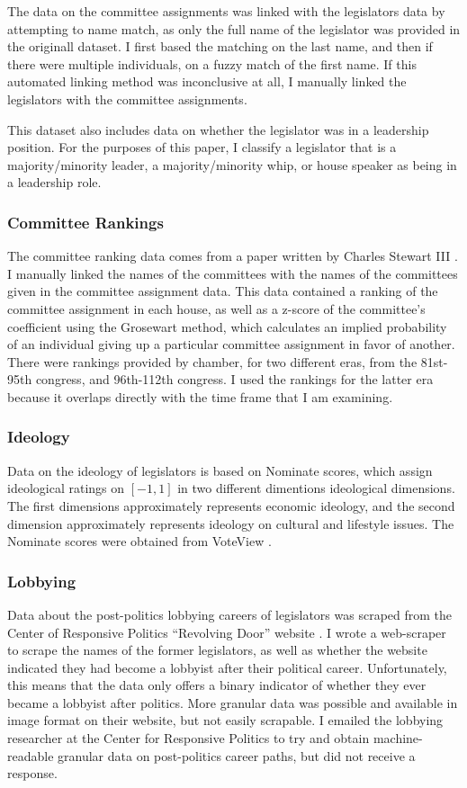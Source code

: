 \documentclass{article}
\begin{document}
The data on the committee assignments was linked with the legislators data by attempting to name match, as only the full name of the legislator was provided in the originall dataset. I first based the matching on the last name, and then if there were multiple individuals, on a fuzzy match of the first name. If this automated linking method was inconclusive at all, I manually linked the legislators with the committee assignments. 

This dataset also includes data on whether the legislator was in a leadership position. For the purposes of this paper, I classify a legislator that is a majority/minority leader, a majority/minority whip, or house speaker as being in a leadership role. 

\subsubsection{Committee Rankings}
The committee ranking data comes from a paper written by Charles Stewart III \cite{stewart-committee-values}. I manually linked the names of the committees with the names of the committees given in the committee assignment data. This data contained a ranking of the committee assignment in each house, as well as a z-score of the committee's coefficient using the Grosewart method, which calculates an implied probability of an individual giving up a particular committee assignment in favor of another. There were rankings provided by chamber, for two different eras, from the 81st-95th congress, and 96th-112th congress. I used the rankings for the latter era because it overlaps directly with the time frame that I am examining.

\subsubsection{Ideology}
Data on the ideology of legislators is based on Nominate scores, which assign ideological ratings on $[-1 , 1]$ in two different dimentions ideological dimensions. The first dimensions approximately represents economic ideology, and the second dimension approximately represents ideology on cultural and lifestyle issues. The Nominate scores were obtained from VoteView \cite{nominate}.

\subsubsection{Lobbying}
Data about the post-politics lobbying careers of legislators was scraped from the Center of Responsive Politics ``Revolving Door'' website \cite{revolving-door}. I wrote a web-scraper to scrape the names of the former legislators, as well as whether the website indicated they had become a lobbyist after their political career. Unfortunately, this means that the data only offers a binary indicator of whether they ever became a lobbyist after politics. More granular data was possible and available in image format on their website, but not easily scrapable. I emailed the lobbying researcher at the Center for Responsive Politics to try and obtain machine-readable granular data on post-politics career paths, but did not receive a response. 
\end{document}

